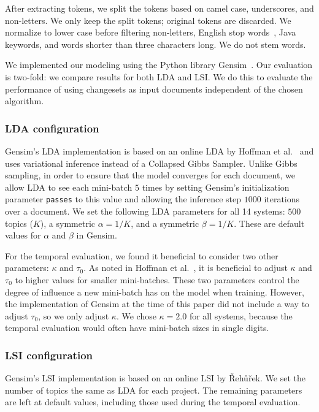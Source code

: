 After extracting tokens, we split the tokens based on camel case,
underscores, and non-letters.
We only keep the split tokens; original tokens are discarded.
We normalize to lower case before filtering non-letters, English stop words~\cite{StopWords}, Java keywords, and words shorter than three characters long.
We do not stem words.

We implemented our modeling using the Python library Gensim~\cite{Gensim}.
Our evaluation is two-fold: we compare results for both LDA and LSI.
We do this to evaluate the performance of using changesets as input
documents independent of the chosen algorithm.

\subsubsection{LDA configuration}

Gensim's LDA implementation is based on an online LDA by Hoffman et
al.~\cite{Hoffman-etal:2010} and uses variational inference instead of a
Collapsed Gibbs Sampler.  Unlike Gibbs sampling, in order to ensure that the
model converges for each document, we allow LDA to see each mini-batch $5$
times by setting Gensim's initialization parameter \texttt{passes} to this
value and allowing the inference step $1000$ iterations over a document.  We
set the following LDA parameters for all 14 systems: $500$ topics ($K$), a
symmetric $\alpha=1/K$, and a symmetric $\beta=1/K$.  These are default values
for $\alpha$ and $\beta$ in Gensim.

For the temporal evaluation, we found it beneficial to consider two other
parameters: $\kappa$ and $\tau_0$.  As noted in Hoffman et
al.~\cite{Hoffman-etal:2010}, it is beneficial to adjust $\kappa$ and $\tau_0$
to higher values for smaller mini-batches.  These two parameters control the
degree of influence a new mini-batch has on the model when training.  However,
the implementation of Gensim at the time of this paper did not include a way to
adjust $\tau_0$, so we only adjust $\kappa$.  We chose $\kappa=2.0$ for all
systems, because the temporal evaluation would often have mini-batch sizes in
single digits.

\subsubsection{LSI configuration}

Gensim's LSI implementation is based on an online LSI by {\v R}eh{\r u}{\v r}ek\cite{Radim:2011}.
We set the number of topics the same as LDA for each project.
The remaining parameters are left at default values, including those used
during the temporal evaluation.


